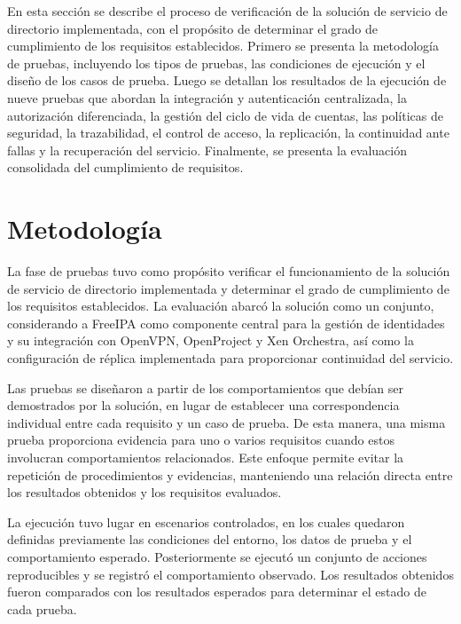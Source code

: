 \label{cap:pruebas}
\vspace*{0.7cm}

En esta sección se describe el proceso de verificación de la solución de servicio de directorio implementada, con el propósito de determinar el grado de cumplimiento de los requisitos establecidos. Primero se presenta la metodología de pruebas, incluyendo los tipos de pruebas, las condiciones de ejecución y el diseño de los casos de prueba. Luego se detallan los resultados de la ejecución de nueve pruebas que abordan la integración y autenticación centralizada, la autorización diferenciada, la gestión del ciclo de vida de cuentas, las políticas de seguridad, la trazabilidad, el control de acceso, la replicación, la continuidad ante fallas y la recuperación del servicio. Finalmente, se presenta la evaluación consolidada del cumplimiento de requisitos.

\section{Metodología}
La fase de pruebas tuvo como propósito verificar el funcionamiento de la solución de servicio de directorio implementada y determinar el grado de cumplimiento de los requisitos establecidos.
La evaluación abarcó la solución como un conjunto, considerando a FreeIPA como componente central para la gestión de identidades y su integración con OpenVPN, OpenProject y Xen Orchestra, así como la configuración de réplica implementada para proporcionar continuidad del servicio.

Las pruebas se diseñaron a partir de los comportamientos que debían ser demostrados por la solución, en lugar de establecer una correspondencia individual entre cada requisito y un caso de prueba. De esta manera, una misma prueba proporciona evidencia para uno o varios requisitos cuando estos involucran comportamientos relacionados. Este enfoque permite evitar la repetición de procedimientos y evidencias, manteniendo una relación directa entre los resultados obtenidos y los requisitos evaluados.

La ejecución tuvo lugar en escenarios controlados, en los cuales quedaron definidas previamente las condiciones del entorno, los datos de prueba y el comportamiento esperado. Posteriormente se ejecutó un conjunto de acciones reproducibles y se registró el comportamiento observado. Los resultados obtenidos fueron comparados con los resultados esperados para determinar el estado de cada prueba.

